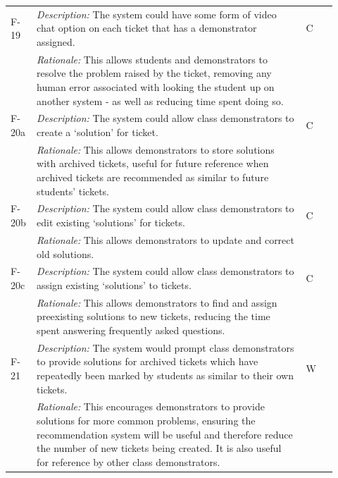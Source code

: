 \begin{table}[H]
\begin{tabular}{|p{0.05\linewidth} | p{0.78\linewidth} |p{0.09\linewidth}|}
   \hline\hline
 F-19 & \textit{Description:} The system could have some form of video chat option on each ticket that has a demonstrator assigned. & C\\
  \cline{2-2}
  & \textit{Rationale:} This allows students and demonstrators to resolve the problem raised by the ticket, removing any human error associated with looking the student up on another system - as well as reducing time spent doing so. & \\

   \hline\hline
 F-20a & \textit{Description:} The system could allow class demonstrators to create a `solution' for ticket. & C\\
  \cline{2-2}
  & \textit{Rationale:} This allows demonstrators to store solutions with archived tickets, useful for future reference when archived tickets are recommended as similar to future students' tickets. & \\
  
  \hline\hline
 F-20b & \textit{Description:} The system could allow class demonstrators to edit existing `solutions' for tickets. & C\\
  \cline{2-2}
  & \textit{Rationale:} This allows demonstrators to update and correct old solutions. & \\
  
    \hline\hline
 F-20c & \textit{Description:} The system could allow class demonstrators to assign existing `solutions' to tickets. & C\\
  \cline{2-2}
  & \textit{Rationale:} This allows demonstrators to find and assign preexisting solutions to new tickets, reducing the time spent answering frequently asked questions. & \\

   \hline\hline
 F-21 & \textit{Description:} The system would prompt class demonstrators to provide solutions for archived tickets which have repeatedly been marked by students as similar to their own tickets. & W\\
  \cline{2-2}
  & \textit{Rationale:} This encourages demonstrators to provide solutions for more common problems, ensuring the recommendation system will be useful and therefore reduce the number of new tickets being created. It is also useful for reference by other class demonstrators. & \\

     \hline
 
 \end{tabular}
\end{table}
 
